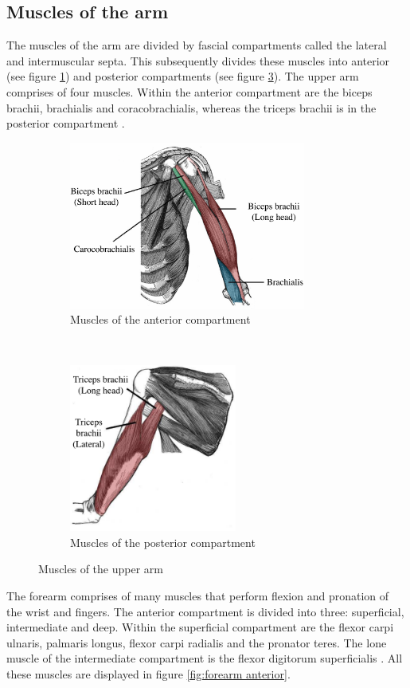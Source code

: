 \subsection{Muscles of the arm}
The muscles of the arm are divided by fascial compartments called the lateral and intermuscular septa. This subsequently divides these muscles into anterior (see figure \ref{fig:upper arm anterior}) and posterior compartments (see figure \ref{fig:upper arm posterior}). The upper arm comprises of four muscles. Within the anterior compartment are the biceps brachii, brachialis and coracobrachialis, whereas the triceps brachii is in the posterior compartment \cite{scanlon2014essentials}. 

\begin{figure}[!htpb]
	\begin{subfigure}[t]{0.52\textwidth}
		\centering
		\includegraphics[height=5.5cm,keepaspectratio]{figure15a}
		\caption{Muscles of the anterior compartment}
		\label{fig:upper arm anterior}
	\end{subfigure}
	~
	\begin{subfigure}[t]{0.44\textwidth}
		\centering
		\includegraphics[height=5.5cm,keepaspectratio]{figure15b}
		\caption{Muscles of the posterior compartment}
		\label{fig:upper arm posterior}
	\end{subfigure}
	\caption{Muscles of the upper arm}
\end{figure}

The forearm comprises of many muscles that perform flexion and pronation of the wrist and fingers. The anterior compartment is divided into three: superficial, intermediate and deep. Within the superficial compartment are the flexor carpi ulnaris, palmaris longus, flexor carpi radialis and the pronator teres. The lone muscle of the intermediate compartment is the flexor digitorum superficialis \cite{scanlon2014essentials}. All these muscles are displayed in figure \ref{fig:forearm anterior}.

